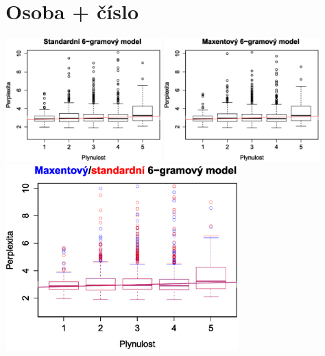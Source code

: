 \documentclass[12pt,a4paper]{report}
\begin{document}
\section{Osoba + číslo}
\begin{center}
	\includegraphics[width=60mm]{./grafy/morf/ngram/osoba+cislo.svg.eps}
	\includegraphics[width=60mm]{./grafy/morf/maxent/osoba+cislo.svg.eps}	
	\includegraphics[width=90mm]{./grafy/morf/porovnani/osoba+cislo.svg.eps}	
\end{center}
\end{document}

